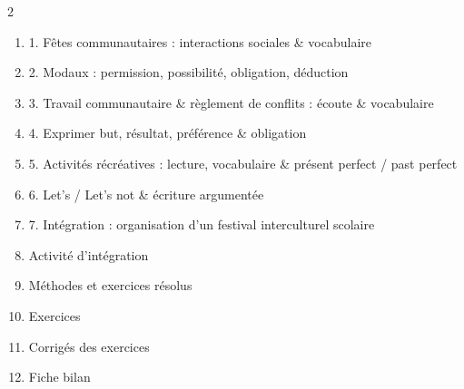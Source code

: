 \documentclass[11pt]{article}
\begin{document}
\begin{sommaire}
\begin{multicols}{2}
\begin{enumerate}
\item 1. Fêtes communautaires : interactions sociales \& vocabulaire
\item 2. Modaux : permission, possibilité, obligation, déduction
\item 3. Travail communautaire \& règlement de conflits : écoute \& vocabulaire
\item 4. Exprimer but, résultat, préférence \& obligation
\item 5. Activités récréatives : lecture, vocabulaire \& présent perfect / past perfect
\item 6. Let's / Let's not \& écriture argumentée
\item 7. Intégration : organisation d'un festival interculturel scolaire
\item Activité d'intégration
\item Méthodes et exercices résolus
\item Exercices
\item Corrigés des exercices
\item Fiche bilan
\end{enumerate}
\end{multicols}
\end{sommaire}
\end{document}

